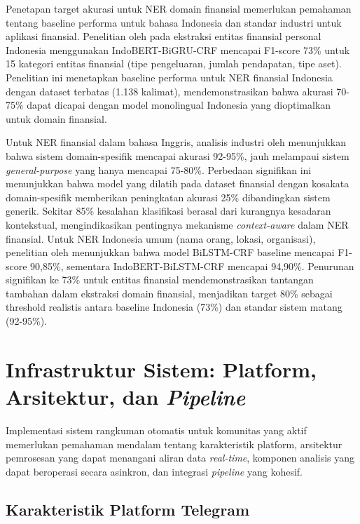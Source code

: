 Penetapan target akurasi untuk NER domain finansial memerlukan pemahaman tentang baseline performa untuk bahasa Indonesia dan standar industri untuk aplikasi finansial. Penelitian oleh \textcite{dave2024} pada ekstraksi entitas finansial personal Indonesia menggunakan IndoBERT-BiGRU-CRF mencapai F1-score 73\% untuk 15 kategori entitas finansial (tipe pengeluaran, jumlah pendapatan, tipe aset). Penelitian ini menetapkan baseline performa untuk NER finansial Indonesia dengan dataset terbatas (1.138 kalimat), mendemonstrasikan bahwa akurasi 70-75\% dapat dicapai dengan model monolingual Indonesia yang dioptimalkan untuk domain finansial.

Untuk NER finansial dalam bahasa Inggris, analisis industri oleh \textcite{phoenix2024} menunjukkan bahwa sistem domain-spesifik mencapai akurasi 92-95\%, jauh melampaui sistem \textit{general-purpose} yang hanya mencapai 75-80\%. Perbedaan signifikan ini menunjukkan bahwa model yang dilatih pada dataset finansial dengan kosakata domain-spesifik memberikan peningkatan akurasi 25\% dibandingkan sistem generik. Sekitar 85\% kesalahan klasifikasi berasal dari kurangnya kesadaran kontekstual, mengindikasikan pentingnya mekanisme \textit{context-aware} dalam NER finansial. Untuk NER Indonesia umum (nama orang, lokasi, organisasi), penelitian oleh \textcite{khairunnisa2020} menunjukkan bahwa model BiLSTM-CRF baseline mencapai F1-score 90,85\%, sementara IndoBERT-BiLSTM-CRF mencapai 94,90\%. Penurunan signifikan ke 73\% untuk entitas finansial mendemonstrasikan tantangan tambahan dalam ekstraksi domain finansial, menjadikan target 80\% sebagai threshold realistis antara baseline Indonesia (73\%) dan standar sistem matang (92-95\%).


\section{Infrastruktur Sistem: Platform, Arsitektur, dan \textit{Pipeline}}
\label{sec:system-infrastructure}

Implementasi sistem rangkuman otomatis untuk komunitas yang aktif memerlukan pemahaman mendalam tentang karakteristik platform, arsitektur pemrosesan yang dapat menangani aliran data \textit{real-time}, komponen analisis yang dapat beroperasi secara asinkron, dan integrasi \textit{pipeline} yang kohesif.

\subsection{Karakteristik Platform Telegram}

